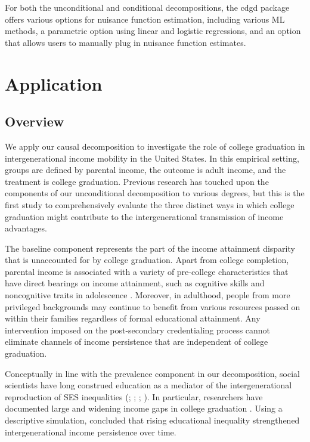 \documentclass[12pt,a4paper]{article}
\begin{document}
For both the unconditional and conditional decompositions, the cdgd package offers various options for nuisance function estimation, including various ML methods, a parametric option using linear and logistic regressions, and an option that allows users to manually plug in nuisance function estimates.


\section{Application}
\subsection{Overview}
We apply our causal decomposition to investigate the role of college graduation in intergenerational income mobility in the United States. In this empirical setting, groups are defined by parental income, the outcome  is adult income, and the treatment is college graduation. 
Previous research has touched upon the components of our unconditional decomposition to various degrees, but this is the first study to comprehensively evaluate the three distinct ways in which college graduation might contribute to the intergenerational transmission of income advantages. 

The baseline component represents the part of the income attainment disparity that is unaccounted for by college graduation. Apart from college completion, parental income is associated with a variety of pre-college characteristics that have direct bearings on income attainment, such as cognitive skills and noncognitive traits in adolescence \citep{reardon_widening_2011, heckman_effects_2006, farkas_cognitive_2003}. Moreover, in adulthood, people from more privileged backgrounds may continue to benefit from various resources passed on within their families regardless of formal educational attainment. Any intervention imposed on the post-secondary credentialing process cannot eliminate channels of income persistence that are independent of college graduation. 

Conceptually in line with the prevalence component in our decomposition, social scientists have long construed education as a mediator of the intergenerational reproduction of SES inequalities (\citealp[chapter 4 \& 5]{blau_american_1978}; \citealp[p.255-9]{featherman_opportunity_1978}; \citealp{ishida_class_1995}; \citealp{breen_educational_2010}). In particular, researchers have documented large and widening income gaps in college graduation \citep{ziol-guest_parent_2016, bailey_gains_2011}. Using a descriptive simulation, \citet{bloome_educational_2018} concluded that rising educational inequality strengthened intergenerational income persistence over time. 
\end{document}
